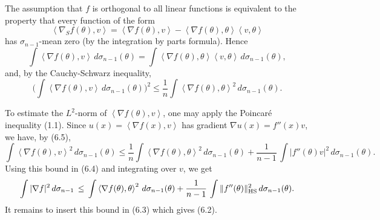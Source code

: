 \documentclass[reqno,12pt]{amsart}
\theoremstyle{plain}
\begin{document}
The assumption that $f$ is orthogonal to all linear functions is equivalent
to the property that every function of the form
$$
\left<\nabla_S f(\theta),v\right>  =  
\left<\nabla f(\theta),v\right> - 
\left<\nabla f(\theta),\theta\right> \left<v,\theta\right>
$$ 
has $\sigma_{n-1}$-mean zero (by the integration by parts formula). Hence
$$
\int \left<\nabla f(\theta),v\right>\,d\sigma_{n-1}(\theta) =
\int 
\left<\nabla f(\theta),\theta\right> \left<v,\theta\right>\,d\sigma_{n-1}(\theta),
$$
and, by the Cauchy-Schwarz inequality,
\begin{equation}
\Big(\int \left<\nabla f(\theta),v\right>\,d\sigma_{n-1}(\theta)\Big)^2
\leq \frac{1}{n} \int 
\left<\nabla f(\theta),\theta\right>^2\,d\sigma_{n-1}(\theta).
\end{equation}

To estimate the $L^2$-norm of $\left<\nabla f(\theta),v\right>$, 
one may apply the Poincar\'e inequality (1.1). Since
$u(x) = \left<\nabla f(x),v\right>$ has gradient 
$\nabla u(x) = f''(x)v$, we have, by (6.5),
$$
\int \left<\nabla f(\theta),v\right>^2\,d\sigma_{n-1}(\theta) \leq 
\frac{1}{n} \int 
\left<\nabla f(\theta),\theta\right>^2\,d\sigma_{n-1}(\theta) +
\frac{1}{n-1}\,\int |f''(\theta)v|^2\,d\sigma_{n-1}(\theta).
$$
Using this bound in (6.4) and integrating over $v$, we get
$$
\int |\nabla f|^2\,d\sigma_{n-1} \, \leq \,
\int 
\left<\nabla f(\theta),\theta\right>^2\,d\sigma_{n-1}(\theta) +
\frac{1}{n-1}\,\int \|f''(\theta)\|^2_{\rm HS}\,d\sigma_{n-1}(\theta).
$$
It remains to insert this bound in (6.3) which gives (6.2).
\end{document}
